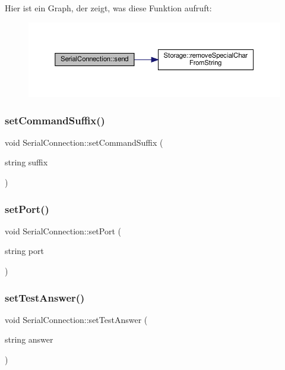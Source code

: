 Hier ist ein Graph, der zeigt, was diese Funktion aufruft\+:\nopagebreak
\begin{figure}[H]
\begin{center}
\leavevmode
\includegraphics[width=350pt]{class_serial_connection_a31a09de5479fb612aac94ade315d6f0e_cgraph}
\end{center}
\end{figure}
\mbox{\label{class_serial_connection_aee2098908b7fcdc959c4029f6cf02151}} 
\subsubsection{set\+Command\+Suffix()}
{\footnotesize\ttfamily void Serial\+Connection\+::set\+Command\+Suffix (\begin{DoxyParamCaption}\item[{string}]{suffix }\end{DoxyParamCaption})}

\mbox{\label{class_serial_connection_af12096e43282f0857d05ad7f4c26e655}} 
\subsubsection{set\+Port()}
{\footnotesize\ttfamily void Serial\+Connection\+::set\+Port (\begin{DoxyParamCaption}\item[{string}]{port }\end{DoxyParamCaption})}

\mbox{\label{class_serial_connection_aadcb81bf3f4f3e90676b5c9495ea497f}} 
\subsubsection{set\+Test\+Answer()}
{\footnotesize\ttfamily void Serial\+Connection\+::set\+Test\+Answer (\begin{DoxyParamCaption}\item[{string}]{answer }\end{DoxyParamCaption})}

